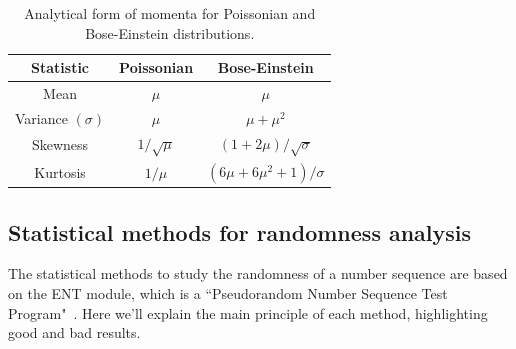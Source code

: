 \documentclass[prl,twocolumn]{revtex4-1}
\begin{document}
\begin{table}[h!]
    \centering
    \begin{tabular}{|c||c||c|}
        \hline
        \textbf{Statistic} & \textbf{Poissonian} & \textbf{Bose-Einstein} \\
        \hline
        \hline
        Mean & $\mu$ & $\mu$ \\
        \hline
        Variance $(\sigma)$ & $\mu$ & $\mu + \mu^2$ \\
        \hline
        Skewness & $1/\sqrt{\mu}$ & $(1 + 2\mu)/\sqrt{\sigma}$ \\
        \hline
        Kurtosis & $1/\mu$ & $(6\mu + 6\mu^2 + 1)/\sigma$ \\
        \hline
    \end{tabular}
    \caption{Analytical form of momenta for Poissonian and Bose-Einstein distributions.}
\label{tab:momenta}
\end{table}

\subsection{Statistical methods for randomness analysis}
\label{sec:appendix_random}
The statistical methods to study the randomness of a number sequence are based on the ENT module, which is a ``Pseudorandom Number Sequence Test Program"~\cite{fourmilab}. Here we'll explain the main principle of each method, highlighting good and bad results. 
\end{document}
